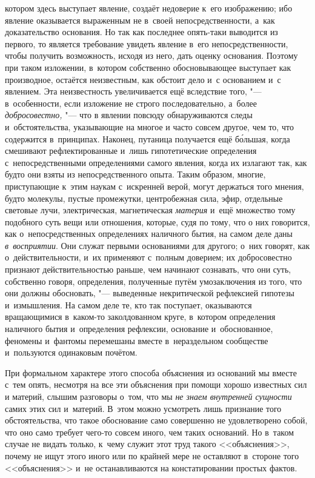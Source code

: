 котором здесь выступает явление, создаёт недоверие к~его изображению; ибо
явление оказывается выраженным не в~своей непосредственности, а~как
доказательство основания. Но так как последнее опять-таки выводится из первого,
то является требование увидеть явление в~его непосредственности, чтобы получить
возможность, исходя из него, дать оценку основания. Поэтому при таком
изложении, в~котором собственно обосновывающее выступает как производное,
остаётся неизвестным, как обстоит дело и~с основанием и~с явлением. Эта
неизвестность увеличивается ещё вследствие того, "--- в~особенности, если
изложение не строго последовательно, а~более {\em добросовестно,} "--- что в
явлении повсюду обнаруживаются следы и~обстоятельства, указывающие на многое и
часто совсем другое, чем то, что содержится в~принципах. Наконец, путаница
получается ещё б\'{о}льшая, когда смешивают рефлектированные и~лишь
гипотетические определения с~непосредственными определениями самого явления,
когда их излагают так, как будто они взяты из непосредственного опыта. Таким
образом, многие, приступающие к~этим наукам с~искренней верой, могут держаться
того мнения, будто молекулы, пустые промежутки, центробежная сила, эфир,
отдельные световые лучи, электрическая, магнетическая {\em материя} и~ещё
множество тому подобного суть вещи или отношения, которые, судя по тому, что о
них говорится, как о~непосредственных определениях наличного бытия, на самом
деле даны {\em в~восприятии}. Они служат первыми основаниями для другого; о~них
говорят, как о~действительности, и~их применяют с~полным доверием; их
добросовестно признают действительностью раньше, чем начинают сознавать, что
они суть, собственно говоря, определения, полученные путём умозаключения из
того, что они должны обосновать, "--- выведенные некритической рефлексией
гипотезы и~измышления. На самом деле те, кто так поступает, оказываются
вращающимися в~каком-то заколдованном круге, в~котором определения наличного
бытия и~определения рефлексии, основание и~обоснованное, феномены и~фантомы
перемешаны вместе в~нераздельном сообществе и~пользуются одинаковым почётом.

При формальном характере этого способа объяснения из оснований мы вместе с~тем
опять, несмотря на все эти объяснения при помощи хорошо известных сил и
материй, слышим разговоры о~том, что мы {\em не знаем внутренней сущности}
самих этих сил и~материй. В~этом можно усмотреть лишь признание того
обстоятельства, что такое обоснование само совершенно не удовлетворено собой,
что оно само требует чего-то совсем иного, чем таких оснований. Но в~таком
случае не видать только, к~чему служит этот труд такого <<объяснения>>, почему
не ищут этого иного или по крайней мере не оставляют в~стороне того
<<объяснения>> и~не останавливаются на констатировании простых фактов.

